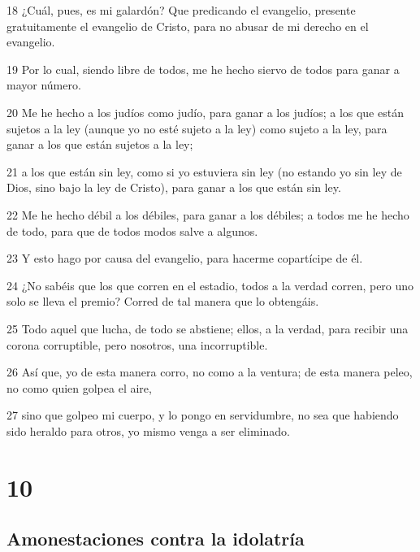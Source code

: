 \par 18 ¿Cuál, pues, es mi galardón? Que predicando el evangelio, presente gratuitamente el evangelio de Cristo, para no abusar de mi derecho en el evangelio.
\par 19 Por lo cual, siendo libre de todos, me he hecho siervo de todos para ganar a mayor número.
\par 20 Me he hecho a los judíos como judío, para ganar a los judíos; a los que están sujetos a la ley (aunque yo no esté sujeto a la ley) como sujeto a la ley, para ganar a los que están sujetos a la ley;
\par 21 a los que están sin ley, como si yo estuviera sin ley (no estando yo sin ley de Dios, sino bajo la ley de Cristo), para ganar a los que están sin ley.
\par 22 Me he hecho débil a los débiles, para ganar a los débiles; a todos me he hecho de todo, para que de todos modos salve a algunos.
\par 23 Y esto hago por causa del evangelio, para hacerme copartícipe de él.
\par 24 ¿No sabéis que los que corren en el estadio, todos a la verdad corren, pero uno solo se lleva el premio? Corred de tal manera que lo obtengáis.
\par 25 Todo aquel que lucha, de todo se abstiene; ellos, a la verdad, para recibir una corona corruptible, pero nosotros, una incorruptible.
\par 26 Así que, yo de esta manera corro, no como a la ventura; de esta manera peleo, no como quien golpea el aire,
\par 27 sino que golpeo mi cuerpo, y lo pongo en servidumbre, no sea que habiendo sido heraldo para otros, yo mismo venga a ser eliminado.

\chapter{10}

\section*{Amonestaciones contra la idolatría}

